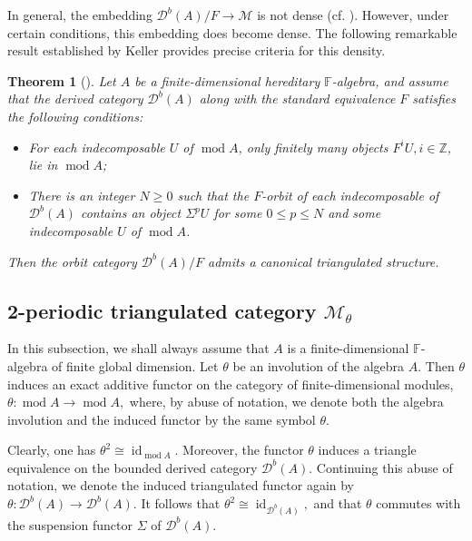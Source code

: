 \documentclass[12pt,reqno]{amsart}
\numberwithin{equation}{section}
\renewcommand{\mod}{\operatorname{mod}\nolimits}
\newtheorem{theorem}{Theorem}[section]
\begin{document}
	In general, the embedding $\mathcal{D}^b(A)/F \rightarrow \mathcal{M}$ is not dense (cf. \cite{Ke05-tri-orb-cat}).
	However, under certain conditions, this embedding does become dense. The following remarkable result established by Keller \cite{Ke05-tri-orb-cat} provides precise criteria for this density.
	
	
	\begin{theorem}[{\cite[Theorem 9.9]{Ke05-tri-orb-cat}}] \label{Thm: tri-orb-cat}
		Let $A$ be a finite-dimensional hereditary $\mathbb{F}$-algebra, and assume that the derived category $\mathcal{D}^b(A)$ along with the standard equivalence $F$ satisfies the following conditions:
		\begin{itemize}
			\item For each indecomposable $U$ of $\mod A$, only finitely many objects $F^iU,i\in \mathbb{Z}$, lie in $\mod A$;
			\item There is an integer $N\ge 0$ such that the $F$-orbit of each indecomposable of $\mathcal{D}^b(A)$ contains an object $\Sigma^p U$ for some $0\le p\le N$ and some indecomposable $U$ of $\mod A$.
		\end{itemize}
		Then the orbit category $\mathcal{D}^b(A)/F$ admits a canonical triangulated structure.
	\end{theorem}
	
	
	\subsection{2-periodic triangulated category $\mathcal{M}_\theta$}\label{ss:2-periodic-M}
	In this subsection, we shall always assume that $A$ is a finite-dimensional
	$\mathbb{F}$-algebra of finite global dimension. Let $\theta$ be an involution
	of the algebra $A$. Then $\theta$ induces an exact additive functor on the
	category of finite-dimensional modules,
	$\theta:\operatorname{mod} A \rightarrow \operatorname{mod} A,$
	where, by abuse of notation, we denote both the algebra involution and the
	induced functor by the same symbol $\theta$.
	
	Clearly, one has $\theta^{2}\cong \operatorname{id}_{\operatorname{mod} A}$. Moreover, the functor
	$\theta$ induces a triangle equivalence on the bounded derived category
	$\mathcal{D}^{b}(A)$. Continuing this abuse of notation, we denote the induced
	triangulated functor again by
	$\theta:\mathcal{D}^{b}(A)\rightarrow \mathcal{D}^{b}(A).$
	It follows that
	$\theta^{2}\cong \operatorname{id}_{\mathcal{D}^{b}(A)},$
	and that $\theta$ commutes with the suspension functor $\Sigma$ of
	$\mathcal{D}^{b}(A)$.
	
\end{document}

